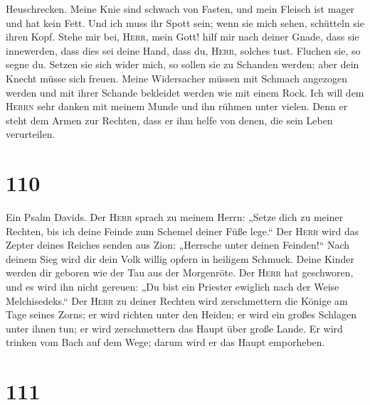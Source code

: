 Heuschrecken.  Meine Knie sind schwach von Fasten, und
mein Fleisch ist mager und hat kein Fett.  Und ich muss
ihr Spott sein; wenn sie mich sehen, schütteln sie ihren Kopf.
 Stehe mir bei, \textsc{Herr}, mein Gott! hilf mir nach
deiner Gnade,  dass sie innewerden, dass dies sei deine
Hand, dass du, \textsc{Herr}, solches tust.  Fluchen sie,
so segne du. Setzen sie sich wider mich, so sollen sie zu Schanden
werden; aber dein Knecht müsse sich freuen.  Meine
Widersacher müssen mit Schmach angezogen werden und mit ihrer Schande
bekleidet werden wie mit einem Rock.  Ich will dem
\textsc{Herrn} sehr danken mit meinem Munde und ihn rühmen unter vielen.
 Denn er steht dem Armen zur Rechten, dass er ihm helfe
von denen, die sein Leben verurteilen.

\hypertarget{section-109}{%
\section{110}\label{section-109}}

 Ein Psalm Davids. Der \textsc{Herr} sprach zu meinem
Herrn: „Setze dich zu meiner Rechten, bis ich deine Feinde zum Schemel
deiner Füße lege.``  Der \textsc{Herr} wird das Zepter
deines Reiches senden aus Zion: „Herrsche unter deinen Feinden!{}``
 Nach deinem Sieg wird dir dein Volk willig opfern in
heiligem Schmuck. Deine Kinder werden dir geboren wie der Tau aus der
Morgenröte.  Der \textsc{Herr} hat geschworen, und es wird
ihn nicht gereuen: „Du bist ein Priester ewiglich nach der Weise
Melchisedeks.``  Der \textsc{Herr} zu deiner Rechten wird
zerschmettern die Könige am Tage seines Zorns;  er wird
richten unter den Heiden; er wird ein großes Schlagen unter ihnen tun;
er wird zerschmettern das Haupt über große Lande.  Er wird
trinken vom Bach auf dem Wege; darum wird er das Haupt emporheben.

\hypertarget{section-110}{%
\section{111}\label{section-110}}

